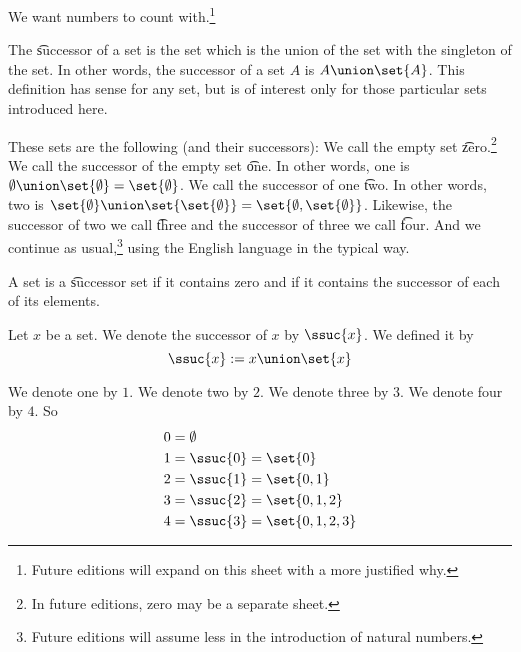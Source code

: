 

We want numbers to count with.\footnote{Future editions will expand on this sheet with a more justified why.}


The \t{successor} of a set is the set which is the union of the set with the singleton of the set.
In other words, the successor of a set $A$ is $A \union \set{A}$.
This definition has sense for any set, but is of interest only for those particular sets introduced here.

These sets are the following (and their successors):
We call the empty set \t{zero}.\footnote{In future editions, zero may be a separate sheet.}
We call the successor of the empty set \t{one}.
In other words, one is $\emptyset \union \set{\emptyset} = \set{\emptyset}$.
We call the successor of one \t{two}.
In other words, two is $\set{\emptyset} \union \set{\set{\emptyset}} = \set{\emptyset, \set{\emptyset}}$.
Likewise, the successor of two we call \t{three} and the successor of three we call \t{four}.
And we continue as usual,\footnote{Future editions will assume less in the introduction of natural numbers.} using the English language in the typical way.


A set is a \t{successor set} if it contains zero and if it contains the successor of each of its elements.


Let $x$ be a set.
We denote the successor of $x$ by $\ssuc{x}$.
We defined it by
$$
  \ssuc{x} := x \union \set{x}
$$

We denote one by $1$.
We denote two by $2$.
We denote three by $3$.
We denote four by $4$.
So
\[
  \begin{aligned}
    0 &= \emptyset \\
    1 &= \ssuc{0} = \set{0} \\
    2 &= \ssuc{1} = \set{0, 1} \\
    3 &= \ssuc{2} = \set{0, 1, 2} \\
    4 &= \ssuc{3} = \set{0, 1, 2, 3} \\
  \end{aligned}
\]
